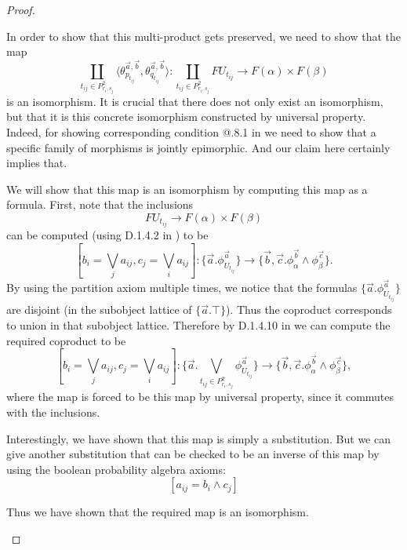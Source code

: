\documentclass[a4paper]{amsproc}
\makeatletter
\theoremstyle{plain}
\theoremstyle{definition}
\theoremstyle{remark}
\numberwithin{equation}{section}
\newcommand{\Rmnum}[1]{\expandafter\@slowromancap\romannumeral #1@}
\makeatother
\begin{document}
\begin{proof}
\begin{enumerate}
        In order to show that this multi-product gets preserved, we need to show that the map
        \[
            \coprod_{t_{ij} \in P^2_{r_i,s_j}} \langle \theta^{\vec{a},\vec{b}}_{p_{t_{ij}}}, \theta^{\vec{a},\vec{b}}_{q_{t_{ij}}} \rangle : \coprod_{t_{ij} \in P^2_{r_i,s_j}} F U_{t_{ij}} \to F(\alpha) \times F(\beta)
        \]
        is an isomorphism. It is crucial that there does not only exist an isomorphism, but that it is this concrete isomorphism constructed by universal property. Indeed, for showing corresponding condition \Rmnum{7}.8.1 in \cite{sheaves_geometry_logic} we need to show that a specific family of morphisms is jointly epimorphic. And our claim here certainly implies that.

        We will show that this map is an isomorphism by computing this map as a formula. First, note that the inclusions
        \[
            FU_{t_{ij}} \to F(\alpha) \times F(\beta)
        \]
        can be computed (using D.1.4.2 in \cite{elephant}) to be
        \[
            [ b_i = \bigvee_j a_{ij}, c_j = \bigvee_i a_{ij} ] :\{ \vec{a}. \phi^{\vec{a}}_{U_{t_{ij}}} \} \to \{ \vec{b},\vec{c} . \phi^{\vec{b}}_{\alpha} \wedge \phi^{\vec{c}}_{\beta} \} .
        \]
        By using the partition axiom multiple times, we notice that the formulas $\{ \vec{a} . \phi^{\vec{a}}_{U_{t_{ij}}}\}$ are disjoint (in the subobject lattice of $\{ \vec{a} . \top \}$). Thus the coproduct corresponds to union in that subobject lattice. Therefore by D.1.4.10 in \cite{elephant} we can compute the required coproduct to be
        \[
            [ b_i = \bigvee_j a_{ij}, c_j = \bigvee_i a_{ij} ]: \{ \vec{a}.\bigvee_{t_{ij} \in P^2_{r_i,s_j} } \phi^{\vec{a}}_{U_{t_{ij}}} \} \to \{\vec{b},\vec{c} . \phi^{\vec{b}}_{\alpha} \wedge \phi^{\vec{c}}_{\beta}\},
        \]
        where the map is forced to be this map by universal property, since it commutes with the inclusions.

        Interestingly, we have shown that this map is simply a substitution. But we can give another substitution that can be checked to be an inverse of this map by using the boolean probability algebra axioms:
        \[
            [a_{ij} = b_i \wedge c_j]
        \]

        Thus we have shown that the required map is an isomorphism.


\end{enumerate}
\end{proof}
\end{document}
